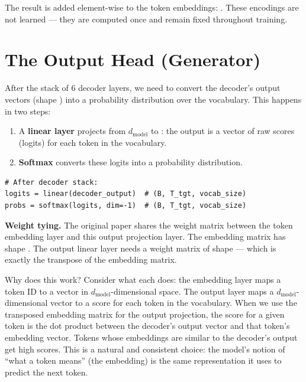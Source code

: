 The result is added element-wise to the token embeddings: . These encodings are not learned --- they are computed once and remain fixed throughout training.

\section{The Output Head (Generator)}

After the stack of 6 decoder layers, we need to convert the decoder's output vectors (shape ) into a probability distribution over the vocabulary. This happens in two steps:

\begin{enumerate}
  \item A \textbf{linear layer} projects from $d_{\text{model}}$ to : the output is a vector of raw scores (logits) for each token in the vocabulary.
  \item \textbf{Softmax} converts these logits into a probability distribution.
\end{enumerate}

\concepttag
\begin{lstlisting}
# After decoder stack:
logits = linear(decoder_output)  # (B, T_tgt, vocab_size)
probs = softmax(logits, dim=-1)  # (B, T_tgt, vocab_size)
\end{lstlisting}

\textbf{Weight tying.} The original paper shares the weight matrix between the token embedding layer and this output projection layer. The embedding matrix has shape . The output linear layer needs a weight matrix of shape  --- which is exactly the transpose of the embedding matrix.

Why does this work? Consider what each does: the embedding layer maps a token ID to a vector in $d_{\text{model}}$-dimensional space. The output layer maps a $d_{\text{model}}$-dimensional vector to a score for each token in the vocabulary. When we use the transposed embedding matrix for the output projection, the score for a given token is the dot product between the decoder's output vector and that token's embedding vector. Tokens whose embeddings are similar to the decoder's output get high scores. This is a natural and consistent choice: the model's notion of ``what a token means'' (the embedding) is the same representation it uses to predict the next token.

